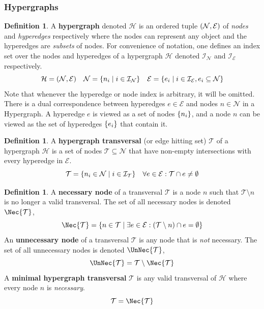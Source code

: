 \documentclass[aps, 10pt, english, twoside, pra, nofootinbib, longbibliography]{revtex4-1}
\theoremstyle{plain}
\theoremstyle{definition}
\newtheorem{definition}[theorem]{Definition}
\theoremstyle{remark}
\newcommand{\hgraph}{\mathcal{H}}
\newcommand{\nodes}{\mathcal{N}}
\newcommand{\edges}{\mathcal{E}}
\newcommand{\trans}{\mathcal{T}}
\newcommand{\ind}{\mathcal{I}}
\newcommand{\term}[1]{\textcolor{Mahogany}{\textbf{#1}}}
\begin{document}
    \subsubsection{Hypergraphs}
    \begin{definition}
        \label{def:hypergraph}
        A \term{hypergraph} denoted $\hgraph$ is an ordered tuple $\br{\nodes, \edges}$ of \textit{nodes} and \textit{hyperedges} respectively where the nodes can represent any object and the hyperedges are \textit{subsets} of nodes. For convenience of notation, one defines an index set over the nodes and hyperedges of a hypergraph $\hgraph$ denoted $\ind_\nodes$ and $\ind_\edges$ respectively.
        \[ \hgraph = \br{\nodes, \edges} \quad \nodes = \bc{n_i \mid i \in \ind_\nodes} \quad \edges = \bc{e_i \mid i \in \ind_\edges, e_i \subseteq \nodes} \]
        Note that whenever the hyperedge or node index is arbitrary, it will be omitted. There is a dual correspondence between hyperedges $e \in \edges$ and nodes $n \in \nodes$ in a Hypergraph. A hyperedge $e$ is viewed as a set of nodes $\bc{n_i}$, and a node $n$ can be viewed as the set of hyperedges $\bc{e_i}$ that contain it.
    \end{definition}

    \begin{definition}
        \label{def:hgraph_trans}
        A \term{hypergraph transversal} (or edge hitting set) $\trans$ of a hypergraph $\hgraph$ is a set of nodes $\trans \subseteq \nodes$ that have non-empty intersections with every hyperedge in $\edges$.
        \[ \trans = \bc{n_i \in \nodes \mid i \in \ind_\trans } \quad \forall e \in \edges : \trans \cap e \neq \emptyset \]
    \end{definition}

    \begin{definition}
        A \term{necessary node} of a transversal $\trans$ is a node $n$ such that $\trans \setminus n$ is no longer a valid transversal. The set of all necessary nodes is denoted $\Nec{\trans}$,
        \[ \Nec{\trans} = \bc{n \in \trans \mid \exists e \in \edges : \br{\trans \setminus n} \cap e = \emptyset} \]
        An \term{unnecessary node} of a transversal $\trans$ is any node that is \textit{not} necessary. The set of all unnecessary nodes is denoted $\UnNec{\trans}$,
        \[ \UnNec{\trans} = \trans \setminus \Nec{\trans} \]
        A \term{minimal hypergraph transversal} $\trans$ is any valid transversal of $\hgraph$ where every node $n$ is \textit{necessary}.
        \[ \trans = \Nec{\trans} \]
    \end{definition}
\end{document}
